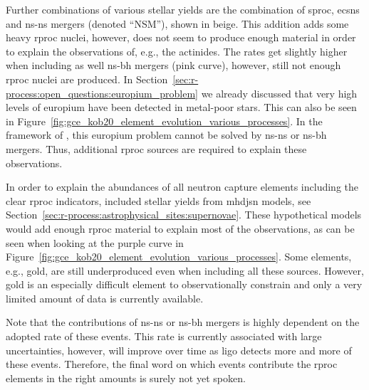 Further combinations of various stellar yields are the combination of \ac{sproc}, \acp{ecsn} and \ac{ns}-\ac{ns} mergers (denoted ``NSM''), shown in beige. This addition adds some heavy \ac{rproc} nuclei, however, does not seem to produce enough material in order to explain the observations of, e.g., the actinides. The rates get slightly higher when including as well \ac{ns}-\ac{bh} mergers (pink curve), however, still not enough \ac{rproc} nuclei are produced. In Section~\ref{sec:r-process:open_questions:europium_problem} we already discussed that very high levels of europium have been detected in metal-poor stars. This can also be seen in Figure~\ref{fig:gce_kob20_element_evolution_various_processes}. In the framework of \citet{kobayashi20}, this europium problem cannot be solved by \ac{ns}-\ac{ns} or \ac{ns}-\ac{bh} mergers. Thus, additional \ac{rproc} sources are required to explain these observations.

In order to explain the abundances of all neutron capture elements including the clear \ac{rproc} indicators, \citet{kobayashi20} included stellar yields from \acf{mhdjsn} models, see Section~\ref{sec:r-process:astrophysical_sites:supernovae}. These hypothetical models would add enough \ac{rproc} material to explain most of the observations, as can be seen when looking at the purple curve in Figure~\ref{fig:gce_kob20_element_evolution_various_processes}. Some elements, e.g., gold, are still underproduced even when including all these sources. However, gold is an especially difficult element to observationally constrain and only a very limited amount of data is currently available. 

Note that the contributions of \ac{ns}-\ac{ns} or \ac{ns}-\ac{bh} mergers is highly dependent on the adopted rate of these events. This rate is currently associated with large uncertainties, however, will improve over time as \ac{ligo} detects more and more of these events. Therefore, the final word on which events contribute the \ac{rproc} elements in the right amounts is surely not yet spoken.

